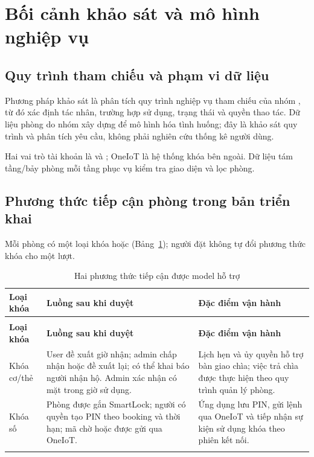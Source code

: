 \section{Bối cảnh khảo sát và mô hình nghiệp vụ}
\subsection{Quy trình tham chiếu và phạm vi dữ liệu}
Phương pháp khảo sát là phân tích quy trình nghiệp vụ tham chiếu của nhóm \cite{quytrinh2026}, từ đó xác định tác nhân, trường hợp sử dụng, trạng thái và quyền thao tác. Dữ liệu phòng do nhóm xây dựng để mô hình hóa tình huống; đây là khảo sát quy trình và phân tích yêu cầu, không phải nghiên cứu thống kê người dùng.

Hai vai trò tài khoản là  và ; OneIoT là hệ thống khóa bên ngoài. Dữ liệu tám tầng/bảy phòng mỗi tầng phục vụ kiểm tra giao diện và lọc phòng.

\subsection{Phương thức tiếp cận phòng trong bản triển khai}
Mỗi phòng có một loại khóa  hoặc  (Bảng~\ref{tab:access-modes}); người đặt không tự đổi phương thức khóa cho một lượt.
{\tabletext\renewcommand{\arraystretch}{1.04}\begin{longtable}{>{\raggedright\arraybackslash}p{}>{\raggedright\arraybackslash}p{}>{\raggedright\arraybackslash}p{}}
\caption{Hai phương thức tiếp cận được model hỗ trợ}\label{tab:access-modes}\\
\toprule \textbf{Loại khóa} & \textbf{Luồng sau khi duyệt} & \textbf{Đặc điểm vận hành}\\\midrule
\endfirsthead
\multicolumn{3}{l}{Hai phương thức tiếp cận (tiếp)}\\
\toprule \textbf{Loại khóa} & \textbf{Luồng sau khi duyệt} & \textbf{Đặc điểm vận hành}\\\midrule
\endhead
\bottomrule\endlastfoot
Khóa cơ/thẻ & User đề xuất giờ nhận; admin chấp nhận hoặc đề xuất lại; có thể khai báo người nhận hộ. Admin xác nhận có mặt trong giờ sử dụng. & Lịch hẹn và ủy quyền hỗ trợ bàn giao chìa; việc trả chìa được thực hiện theo quy trình quản lý phòng.\\\addlinespace[1.5pt]
Khóa số & Phòng được gắn SmartLock; người có quyền tạo PIN theo booking và thời hạn; mã chờ hoặc được gửi qua OneIoT. & Ứng dụng lưu PIN, gửi lệnh qua OneIoT và tiếp nhận sự kiện sử dụng khóa theo phiên kết nối.\\\addlinespace[1.5pt]
\end{longtable}}

